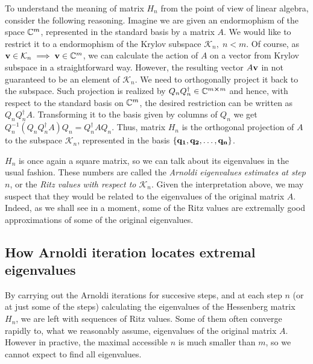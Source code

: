 To understand the meaning
of matrix \(H_n\) from the point of view of linear algebra, consider the following reasoning. Imagine we are
given an endormophism of the space \(\mathbb{C}^m\), represented in the standard basis by a matrix \(A\).
We would like to restrict it to a endormophism of the Krylov subspace \(\mathcal{K}_n,\; n < m\). Of course,
as \(\vectorbold{v} \in \mathcal{K}_n \implies \vectorbold{v} \in \CC^m\), we can calculate the action of \(A\) on a vector
from Krylov subspace in a straightforward way. However, the resulting vector \(A\vectorbold{v}\) in not guaranteed
to be an element of \(\mathcal{K}_n\). We need to orthogonally project it back to the subspace. Such projection
is realized by \(Q_n Q^{\dagger}_n \in \mathbb{C}^{m\cross m}\) and hence, with respect to the standard basis on \(\mathbb{C}^m\),
the desired restriction can be written as \(Q_n Q^{\dagger}_n A\). Transforming it to the basis given by columns of
\(Q_n\) we get \( Q_n^{-1}\left(Q_n Q^{\dagger}_n A\right)Q_n = Q^{\dagger}_n A Q_n\). Thus, matrix \(H_n\)
is the orthogonal projection of \(A\) to the subspace \(\mathcal{K}_n\), represented in the basis
\(\{\vectorbold{q_1},\vectorbold{q_2},\ldots,\vectorbold{q_n}\}\).

\(H_n\) is once again a square matrix, so we can talk about its eigenvalues %
in the usual fashion. These numbers are called the \textit{Arnoldi eigenvalues estimates at step \(n\)}, or
the \textit{Ritz values with respect to \(\mathcal{K}_n\)}.
Given the interpretation above, we may suspect that they would be related to the eigenvalues of the original matrix \(A\).
Indeed, as we shall see in a moment, some of the Ritz values are extremally good approximations of some of the
original eigenvalues.


\subsection{How Arnoldi iteration locates extremal eigenvalues}

By carrying out the Arnoldi iterations for succesive steps, and at each step \(n\) (or at just some of the steps)
calculating the eigenvalues of the Hessenberg matrix \(H_n\), we are left with sequences of Ritz values. Some
of them often converge rapidly to, what we reasonably assume, eigenvalues of the original matrix \(A\).
However in practive, the maximal accessible \(n\) is much smaller than \(m\), so we cannot expect to find
all eigenvalues.




